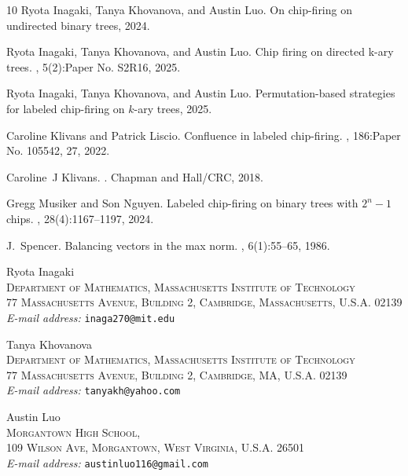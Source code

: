 \documentclass[11pt]{article}
\theoremstyle{definition}
\theoremstyle{remark}
\begin{document}
\begin{thebibliography}{10}
Ryota Inagaki, Tanya Khovanova, and Austin Luo.
\newblock On chip-firing on undirected binary trees, 2024.

Ryota Inagaki, Tanya Khovanova, and Austin Luo.
\newblock Chip firing on directed k-ary trees.
, 5(2):Paper No. S2R16, 2025.

Ryota Inagaki, Tanya Khovanova, and Austin Luo.
\newblock Permutation-based strategies for labeled chip-firing on $k$-ary trees, 2025.

Caroline Klivans and Patrick Liscio.
\newblock Confluence in labeled chip-firing.
, 186:Paper No. 105542, 27, 2022.

Caroline~J Klivans.
.
\newblock Chapman and Hall/CRC, 2018.

Gregg Musiker and Son Nguyen.
\newblock Labeled chip-firing on binary trees with {$2^n-1$} chips.
, 28(4):1167--1197, 2024.

J.~Spencer.
\newblock Balancing vectors in the max norm.
, 6(1):55--65, 1986.

\end{thebibliography}

\smallskip

\noindent
Ryota Inagaki \\
\textsc{
Department of Mathematics, Massachusetts Institute of Technology\\
77 Massachusetts Avenue, Building 2, Cambridge, Massachusetts, U.S.A. 02139}\\
\textit{E-mail address: }\texttt{inaga270@mit.edu}
\medskip

\noindent
Tanya Khovanova \\
\textsc{
Department of Mathematics, Massachusetts Institute of Technology\\
77 Massachusetts Avenue, Building 2, Cambridge, MA, U.S.A. 02139}\\
\textit{E-mail address: }\texttt{tanyakh@yahoo.com}
\medskip

\noindent
Austin Luo \\
\textsc{
Morgantown High School,\\
109 Wilson Ave, Morgantown, West Virginia, U.S.A. 26501}\\
\textit{E-mail address: }\texttt{austinluo116@gmail.com}
\medskip
\end{document}
